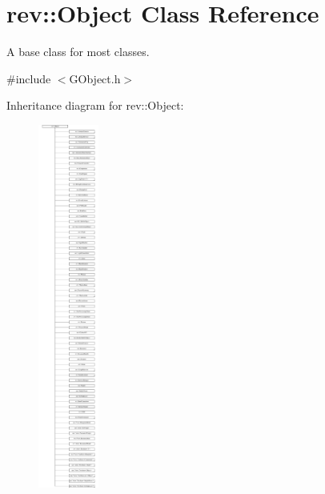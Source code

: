 \hypertarget{classrev_1_1_object}{}\section{rev\+::Object Class Reference}
\label{classrev_1_1_object}


A base class for most classes.  




{\ttfamily \#include $<$G\+Object.\+h$>$}

Inheritance diagram for rev\+::Object\+:\begin{figure}[H]
\begin{center}
\leavevmode
\includegraphics[height=12.000000cm]{classrev_1_1_object}
\end{center}
\end{figure}
